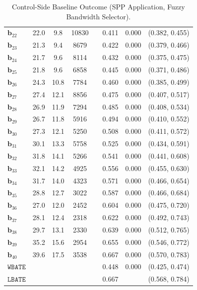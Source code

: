 \documentclass[10pt]{article}
\newcommand{\bb}{\mathbf{b}}
\begin{document}
\begin{table}[p]
\begin{tabular}{lccccccc}
   $\bb_{22}$ & 22.0 & 9.8 & 10830 &  & 0.411 & 0.000 & (0.382, 0.455)\\
   $\bb_{23}$ & 21.3 & 9.4 & 8679 &  & 0.422 & 0.000 & (0.379, 0.466)\\
   $\bb_{24}$ & 21.7 & 9.6 & 8114 &  & 0.432 & 0.000 & (0.375, 0.475)\\
   $\bb_{25}$ & 21.8 & 9.6 & 6858 &  & 0.445 & 0.000 & (0.371, 0.486)\\
   $\bb_{26}$ & 24.3 & 10.8 & 7784 &  & 0.460 & 0.000 & (0.385, 0.499)\\
   $\bb_{27}$ & 27.4 & 12.1 & 8856 &  & 0.475 & 0.000 & (0.407, 0.517)\\
   $\bb_{28}$ & 26.9 & 11.9 & 7294 &  & 0.485 & 0.000 & (0.408, 0.534)\\
   $\bb_{29}$ & 26.7 & 11.8 & 5916 &  & 0.494 & 0.000 & (0.410, 0.552)\\
   $\bb_{30}$ & 27.3 & 12.1 & 5250 &  & 0.508 & 0.000 & (0.411, 0.572)\\
   $\bb_{31}$ & 30.1 & 13.3 & 5758 &  & 0.525 & 0.000 & (0.434, 0.591)\\
   $\bb_{32}$ & 31.8 & 14.1 & 5266 &  & 0.541 & 0.000 & (0.441, 0.608)\\
   $\bb_{33}$ & 32.1 & 14.2 & 4925 &  & 0.556 & 0.000 & (0.455, 0.630)\\
   $\bb_{34}$ & 31.7 & 14.0 & 4323 &  & 0.571 & 0.000 & (0.466, 0.654)\\
   $\bb_{35}$ & 28.8 & 12.7 & 3022 &  & 0.587 & 0.000 & (0.466, 0.684)\\
   $\bb_{36}$ & 27.0 & 12.0 & 2452 &  & 0.604 & 0.000 & (0.475, 0.720)\\
   $\bb_{37}$ & 28.1 & 12.4 & 2318 &  & 0.622 & 0.000 & (0.492, 0.743)\\
   $\bb_{38}$ & 29.7 & 13.1 & 2330 &  & 0.639 & 0.000 & (0.512, 0.765)\\
   $\bb_{39}$ & 35.2 & 15.6 & 2954 &  & 0.655 & 0.000 & (0.546, 0.772)\\
   $\bb_{40}$ & 39.6 & 17.5 & 3538 &  & 0.667 & 0.000 & (0.570, 0.783)\\
  \midrule
   $\mathtt{WBATE}$ &  &  &  &  & 0.448 & 0.000 & (0.425, 0.474)\\
  \midrule
   $\mathtt{LBATE}$ &  &  &  &  & 0.667 &  & (0.568, 0.784)\\
  \bottomrule\bottomrule
\end{tabular}

    \caption{Control-Side Baseline Outcome (SPP Application, Fuzzy Bandwidth Selector).}
    \label{tab:sa-empapp_main_itt0_bwmain}
\end{table}
\end{document}
